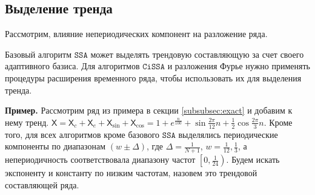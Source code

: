 \documentclass[12pt, specialist, subf
]{disser}
\theoremstyle{definition}
\newcommand{\SSA}{\texttt{SSA}}
\newcommand{\CISSA}{\texttt{CiSSA}}
\newcommand{\TS}{\mathsf{X}}
\begin{document}
%
%


\subsection{Выделение тренда}

\label{subsubsec:trend}

Рассмотрим, влияние непериодических компонент на разложение ряда.

Базовый алгоритм $\SSA$ может выделять трендовую составляющую за счет своего адаптивного базиса. Для алгоритмов $\CISSA$ и разложения Фурье нужно применять процедуры расширения временного ряда, чтобы использовать их для выделения тренда.

\textbf{\large{Пример.}} Рассмотрим ряд из примера в секции \ref{subsubsec:exact} и добавим к нему тренд. $\TS = \TS_{c} + \TS_e + \TS_{\sin} + \TS_{\cos} = 1 + e^{\frac{n}{100}} + \sin{\frac{2\pi}{12}n} + \frac{1}{2}\cos{\frac{2\pi}{3}n}$.
Кроме того, для всех алгоритмов кроме базового $\SSA$ выделялись периодические компоненты по диапазонам $\left(w \pm \Delta \right)$, где $\Delta = \frac{1}{N+1}$, $w = \frac{1}{12}, \frac{1}{3}$, а непериодичность соответствовала диапазону частот $\left[0, \frac{1}{24} \right)$.
Будем искать экспоненту и константу по низким частотам, назовем это трендовой составляющей ряда.
\end{document}
